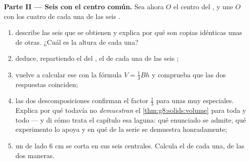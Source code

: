\begin{problem}
\medskip
\noindent\textbf{Parte II --- Seis  con el centro común.}
Sea ahora $O$ el centro del , y une $O$ con los cuatro
 de cada una de las seis .
\begin{enumerate}[resume]
  \item describe las seis  que se obtienen y explica por qué
        son copias idénticas unas de otras. ¿Cuál es la altura
        de cada una?
  \item deduce, repartiendo el  del , el  de cada
        una de las seis ;
  \item vuelve a calcular ese  con la fórmula
        $V = \frac13 B h$ y comprueba que las dos respuestas coinciden;
  \item las dos descomposiciones confirman el factor $\frac13$ para
        unas  muy especiales. Explica por qué todavía no
        \emph{demuestran} el \cref{thm:g8:solids:volume} para toda
         y todo  --- y di cómo trata el capítulo
        esa laguna: qué enunciado se admite, qué experimento
        lo apoya y en qué  de la serie se
        demuestra honradamente;
  \item un  de lado $6$ cm se corta en sus seis 
        centrales. Calcula el  de cada una, de las dos maneras.
\end{enumerate}


\end{problem}

